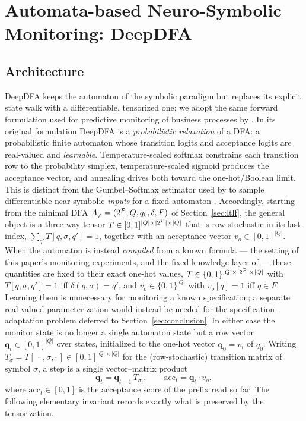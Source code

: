 \section{Automata-based Neuro-Symbolic Monitoring: DeepDFA}
\label{sec:deepdfa}

\subsection{Architecture}
\label{sec:deepdfa-arch}

DeepDFA \cite{deepdfa_ecai2024} keeps the automaton of the symbolic paradigm but replaces its explicit state walk with a differentiable, tensorized one; we adopt the same forward formulation used for predictive monitoring of business processes by \cite{mezini2025neuro}. In its original formulation DeepDFA is a \emph{probabilistic relaxation} of a DFA: a probabilistic finite automaton whose transition logits and acceptance logits are real-valued and \emph{learnable}. Temperature-scaled softmax constrains each transition row to the probability simplex, temperature-scaled sigmoid produces the acceptance vector, and annealing drives both toward the one-hot/Boolean limit. This is distinct from the Gumbel--Softmax estimator used by \cite{mezini2025neuro} to sample differentiable near-symbolic \emph{inputs} for a fixed automaton \cite{gumb_sftmx_1,gumb_sftmx_2}. Accordingly, starting from the minimal DFA $A_\varphi = (2^{\mathcal{P}}, Q, q_0, \delta, F)$ of Section~\ref{sec:ltlf}, the general object is a three-way tensor $T \in [0,1]^{|Q| \times |2^{\mathcal{P}}| \times |Q|}$ that is row-stochastic in its last index, $\sum_{q'} T[q, \sigma, q'] = 1$, together with an acceptance vector $v_o \in [0,1]^{|Q|}$. When the automaton is instead \emph{compiled} from a known \ltlf formula --- the setting of this paper's monitoring experiments, and the fixed knowledge layer of \cite{mezini2025neuro} --- these quantities are fixed to their exact one-hot values, $T \in \{0,1\}^{|Q| \times |2^{\mathcal{P}}| \times |Q|}$ with $T[q, \sigma, q'] = 1$ iff $\delta(q, \sigma) = q'$, and $v_o \in \{0,1\}^{|Q|}$ with $v_o[q] = 1$ iff $q \in F$. Learning them is unnecessary for monitoring a known specification; a separate real-valued parameterization would instead be needed for the specification-adaptation problem deferred to Section~\ref{sec:conclusion}. In either case the monitor state is no longer a single automaton state but a row vector $\mathbf{q}_t \in [0,1]^{|Q|}$ over states, initialized to the one-hot vector $\mathbf{q}_0 = v_i$ of $q_0$. Writing $T_\sigma = T[\,\cdot\,, \sigma, \cdot\,] \in [0,1]^{|Q| \times |Q|}$ for the (row-stochastic) transition matrix of symbol $\sigma$, a step is a single vector--matrix product
\begin{equation}
  \mathbf{q}_t = \mathbf{q}_{t-1}\, T_{\sigma_t},
  \qquad
  \mathrm{acc}_t = \mathbf{q}_t \cdot v_o,
  \label{eq:deepdfa-crisp}
\end{equation}
where $\mathrm{acc}_t \in [0,1]$ is the acceptance score of the prefix read so far. The following elementary invariant records exactly what is preserved by the tensorization.

